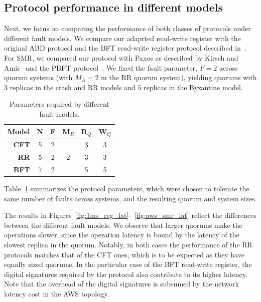\subsection{Protocol performance in different models}\label{ssec:eval_quorum}


Next, we focus on comparing the performance of both classes of protocols under different
fault models.
%
We compare our adaprted read-write register with the original ABD
protocol and the \ac{BFT} read-write register protocol described
in~\cite{Malkhi:Reiter:BQS:98}. For SMR, we compared our protocol with
Paxos as described by Kirsch and Amir~\cite{paxos_builders} and the
PBFT protocol~\cite{pbft}. We fixed the fault parameter, $F= 2$ across
quorum systems (with $M_R=2$ in the \ac{RR} quorum system),
yielding quorums with $3$ replicas in the crash and
\ac{RR} models and $5$ replicas in the Byzantine model.

\begin{table}[b]
    \centering
    \begin{tabular}{|r || c | c | c || c | c |}
        \hline
        \textbf{Model}       & N & F & M$_R$ & R$_Q$ & W$_Q$\\ \hline
        \textbf{\ac{CFT}}         & 5 & 2 &   &   3   &   3  \\
        \textbf{\ac{RR}} & 5 & 2 & 2 &   3   &   3  \\
        \textbf{\ac{BFT}}         & 7 & 2 &   &   5   &   5  \\ \hline
    \end{tabular}
    \caption{Parameters required by different fault models.}\label{table:quorum_sizes}
\end{table}

Table~\ref{table:quorum_sizes} summarizes the protocol parameters,
which were chosen to tolerate the same number of faults across
systems, and the resulting quorum and system sizes.
\fi


The results in Figures~\ref{fig:1ms_reg_lat}-~\ref{fig:aws_smr_lat}
reflect the differences between the different fault models.  We
observe that larger quorums make the operations slower, since the
operation latency is bound by the latency of the slowest replica in
the quorum. Notably, in both cases the performance of the
\ac{RR} protocols matches that of the \ac{CFT} ones, which is to be
expected as they have equally sized quorums. In the particular case of
the \ac{BFT} read-write register, the digital signatures required by the
protocol also contribute to its higher latency. Note that the overhead
of the digital signatures is subsumed by the network latency cost in
the AWS topology.

